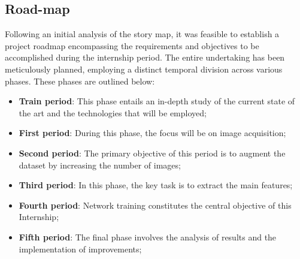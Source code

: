 \subsection{Road-map}
Following an initial analysis of the story map, it was feasible to establish a project roadmap encompassing the requirements and objectives to be accomplished during the internship period. 
The entire undertaking has been meticulously planned, employing a distinct temporal division across various phases. 
These phases are outlined below:
\begin{itemize}
    \item \textbf{Train period}: This phase entails an in-depth study of the current state of the art and the technologies that will be employed;
    \item \textbf{First period}:  During this phase, the focus will be on image acquisition;
    \item \textbf{Second period}: The primary objective of this period is to augment the dataset by increasing the number of images;
    \item \textbf{Third period}:  In this phase, the key task is to extract the main features;
    \item \textbf{Fourth period}: Network training constitutes the central objective of this Internship;
    \item \textbf{Fifth period}: The final phase involves the analysis of results and the implementation of improvements;
\end{itemize}
